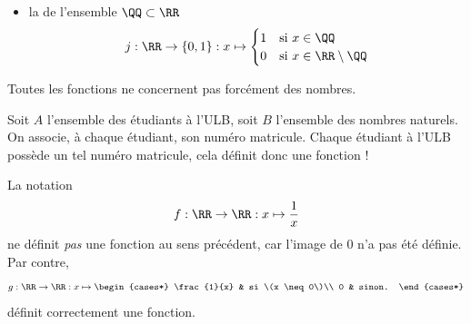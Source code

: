 \begin{frame}
  \begin{example}
    \begin{itemize}[<+->]
    \item la  de l'ensemble \(\QQ \subset \RR\)
      \begin{equation*}
        j : \RR \to \{0,1\} : x \mapsto 
        \begin{cases}
          1 &\text{si } x \in \QQ\\
          0 &\text{si } x \in \RR \setminus \QQ
        \end{cases}
      \end{equation*}
    \end{itemize}
  \end{example}
\end{frame}
\begin{frame}
  Toutes les fonctions ne concernent pas forcément des nombres.
  \begin{example}
    Soit \(A\) l'ensemble des étudiants à l'ULB, soit \(B\) l'ensemble des nombres naturels. On associe, à chaque étudiant, son numéro matricule. Chaque étudiant à l'ULB possède un tel numéro matricule, cela définit donc une fonction !
  \end{example}\pause
  \begin{example}La notation
    \begin{equation*}
      f : \RR \to \RR : x \mapsto \frac{1}{x}
    \end{equation*}
    ne définit \emph{pas} une fonction au sens précédent, car l'image de \(0\) n'a pas été définie. Par contre,
    \begin{equation*}
      g : \RR \to \RR : x \mapsto
      \begin{cases*}
        \frac{1}{x} & si \(x \neq 0\)\\
        0 & sinon.
      \end{cases*}
    \end{equation*}
    définit correctement une fonction.
  \end{example}
\end{frame}

